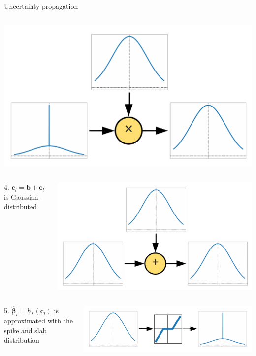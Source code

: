 \documentclass[9pt]{beamer}
\begin{document}
\begin{frame}{Uncertainty propagation}
\begin{columns}
\begin{column}{0.67\textwidth}
        \includegraphics[width=0.75\columnwidth]{graphics/gauss_spsl.pdf}
      \end{column}
    \end{columns}
    \begin{columns}
      \begin{column}{0.33\textwidth}
      4. \(\mathbf{c}_l = \mathbf{b} + \mathbf{e}_l\) is Gaussian-distributed
    \end{column}
    \begin{column}{0.67\textwidth}
        \includegraphics[width=0.75\columnwidth]{graphics/gauss_gauss.pdf}
      \end{column}
    \end{columns}
    \begin{columns}
      \begin{column}{0.33\textwidth}
      5. \(\widehat{\boldsymbol\beta}_{l} = h_\lambda(\mathbf{c}_l)\) is approximated with the spike and slab distribution
    \end{column}
    \begin{column}{0.67\textwidth}
        \includegraphics[width=0.75\columnwidth]{graphics/spsl_propagation.pdf}

\end{column}
\end{columns}
\end{frame}
\end{document}

